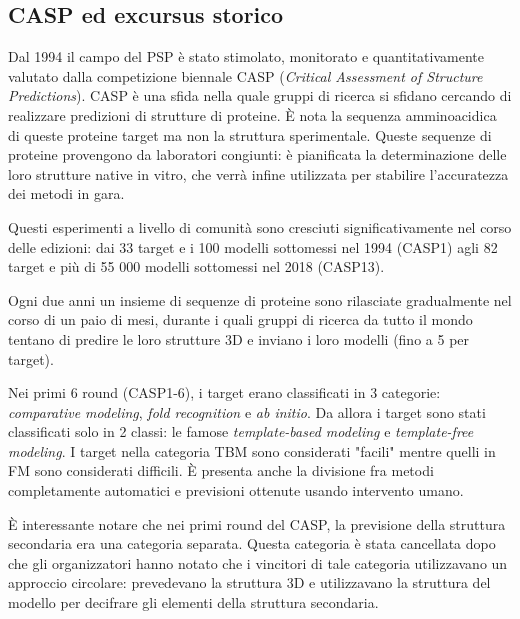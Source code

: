\subsection{CASP ed excursus storico}  \label{sec:CASP}

Dal 1994 il campo del PSP è stato stimolato, monitorato e quantitativamente valutato dalla competizione biennale CASP (\textit{Critical Assessment of Structure Predictions}). CASP è una sfida nella quale gruppi di ricerca si sfidano cercando di realizzare predizioni di strutture di proteine. È nota la sequenza amminoacidica di queste proteine target ma non la struttura sperimentale. Queste sequenze di proteine provengono da laboratori  congiunti: è pianificata la determinazione delle loro strutture native in vitro, che verrà infine utilizzata per stabilire l'accuratezza dei metodi in gara.

\par Questi esperimenti a livello di comunità sono cresciuti significativamente nel corso delle edizioni: dai 33 target e i 100 modelli sottomessi nel 1994 (CASP1) agli 82 target e più di 55 000 modelli sottomessi nel 2018 (CASP13)\supercite{abbass2020enhancing}.

\par Ogni due anni un insieme di sequenze di proteine sono rilasciate gradualmente nel corso di un paio di mesi, durante i quali gruppi di ricerca da tutto il mondo tentano di predire le loro strutture 3D e inviano i loro modelli (fino a 5 per target).

\par Nei primi 6 round (CASP1-6), i target erano classificati in 3 categorie: \textit{comparative modeling}, \textit{fold recognition} e \textit{ab initio}. Da allora i target sono stati classificati solo in 2 classi: le famose \textit{template-based modeling} e \textit{template-free modeling}. I target nella categoria TBM sono considerati "facili" mentre quelli in FM sono considerati difficili. È presenta anche la divisione fra metodi completamente automatici e previsioni ottenute usando intervento umano.

\par È interessante notare che nei primi round del CASP, la previsione della struttura secondaria era una categoria separata. Questa categoria è stata cancellata dopo che gli organizzatori hanno notato che i vincitori di tale categoria utilizzavano un approccio circolare: prevedevano la struttura 3D e utilizzavano la struttura del modello per decifrare gli elementi della struttura secondaria.

